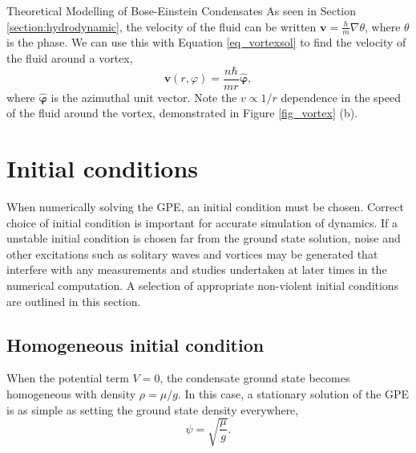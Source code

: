 \begin{chapter}{\label{cha:theoretical_model}Theoretical Modelling of Bose-Einstein Condensates}
As seen in Section \ref{section:hydrodynamic}, the velocity of the fluid can be written $\mathbf{v} = \frac{h}{m}\nabla\theta$, where $\theta$ is the phase. We can use this with Equation \ref{eq_vortexsol} to find the velocity of the fluid around a vortex,
	\begin{equation}\label{eq_vortexvel}
	\mathbf{v}(r,\varphi) = \frac{n \hbar}{mr} {\bm{\hat{\varphi}}},
	\end{equation}
where ${\bm{\hat{\varphi}}}$ is the azimuthal unit vector. Note the $v \propto 1/r$ dependence in the speed of the fluid around the vortex, demonstrated in Figure \ref{fig_vortex} (b). 

\section{\label{section:inital} Initial conditions}
	When numerically solving the GPE, an initial condition must be chosen. Correct choice of initial condition is important for accurate simulation of dynamics. If a unstable initial condition is chosen far from the ground state solution, noise and other excitations such as solitary waves and vortices may be generated that interfere with any measurements and studies undertaken at later times in the numerical computation. A selection of appropriate non-violent initial conditions are outlined in this section. 
	\subsection{\label{section:homoinit} Homogeneous initial condition}
	When the potential term $V=0$, the condensate ground state becomes homogeneous with density $\rho=\mu/g$. In this case, a stationary solution of the GPE is as simple as setting the ground state density everywhere,
	\begin{equation}
		\psi = \sqrt{\frac{\mu}{g}}.
		\label{eq:homoinit}
	\end{equation}


\end{chapter}
